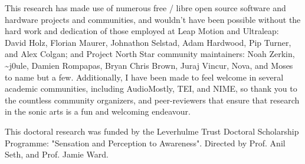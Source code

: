 This research has made use of numerous free / libre open source software and hardware projects and communities, and wouldn't have been possible without the hard work and dedication of those employed at Leap Motion and Ultraleap: David Holz, Florian Maurer, Johnathon Selstad, Adam Hardwood, Pip Turner, and Alex Colgan; and Project North Star community maintainers: Noah Zerkin, \textasciitilde{}j0ule, Damien Rompapas, Bryan Chris Brown, Juraj Vincur, Nova, and Moses to name but a few. Additionally, I have been made to feel welcome in several academic communities, including AudioMostly, TEI, and NIME, so thank you to the countless community organizers, and peer-reviewers that ensure that research in the sonic arts is a fun and welcoming endeavour.

This doctoral research was funded by the Leverhulme Trust Doctoral Scholarship Programme: "Sensation and Perception to Awareness". Directed by Prof. Anil Seth, and Prof. Jamie Ward.
